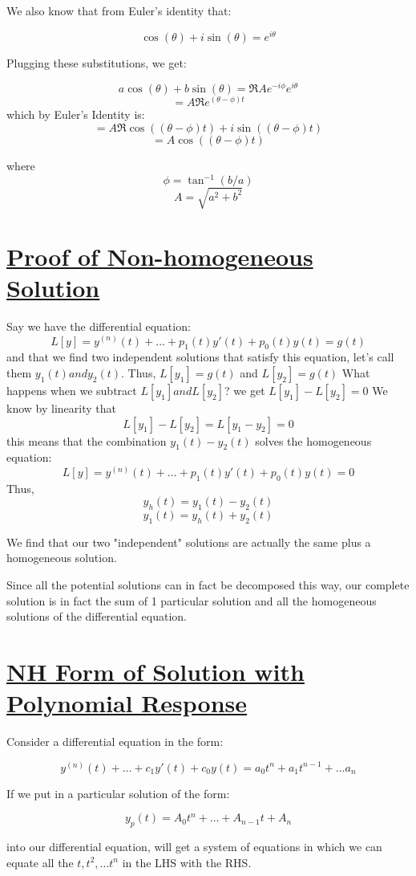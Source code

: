 \documentclass{report}
\begin{document}
{We also know that from Euler's identity that:

$$\cos(\theta) + i\sin(\theta) = e^{i\theta}$$

Plugging these substitutions, we get:

$$a\cos(\theta) + b\sin(\theta) = \Re{Ae^{-i\phi}e^{i\theta}}$$
$$=A\Re{e^{(\theta-\phi)t}}$$
which by Euler's Identity is:
$$=A\Re{\cos((\theta-\phi)t)+i\sin((\theta-\phi)t)}$$
$$=A\cos((\theta-\phi)t)$$

where 
$$\phi = \tan^{-1}(b/a)$$
$$A = \sqrt{a^2+b^2}$$




\section{\hyperref[th:nhSol]{Proof of Non-homogeneous Solution}}
\label{sec:prNhSol}
Say we have the differential equation:
 $$L[y] = y^{(n)}(t) + ... + p_1(t)y'(t) + p_0(t)y(t) = g(t)$$
and that we find two independent solutions that satisfy this equation, let's call them $y_1(t) and y_2(t)$.
Thus, $L[y_1]=g(t)$ and $L[y_2]=g(t)$
What happens when we subtract $L[y_1] and L[y_2]$?
we get $L[y_1]-L[y_2] = 0$
We know by linearity that 
$$L[y_1]-L[y_2] = L[y_1-y_2] = 0$$
this means that the combination $y_1(t)-y_2(t)$ solves the homogeneous equation:
$$L[y] = y^{(n)}(t) + ... + p_1(t)y'(t) + p_0(t)y(t) = 0$$
Thus,
$$y_h(t) = y_1(t)-y_2(t)$$
$$y_1(t) = y_h(t) + y_2(t)$$

We find that our two "independent" solutions are actually the same plus a homogeneous solution.

Since all the potential solutions can in fact be decomposed this way, our complete solution is in fact the sum of 1 particular solution and all the homogeneous solutions of the differential equation.


\section{\hyperref[th:polyResp]{NH Form of Solution with Polynomial Response}}
\label{sec:prPolyResp}
Consider a differential equation in the form:

$$y^{(n)}(t) + \dots + c_1y'(t) + c_0y(t) = a_0t^n + a_1t^{n-1} + \dots a_n$$

If we put in a particular solution of the form:

$$y_p(t) = A_0t^n + \dots + A_{n-1}t + A_n$$

into our differential equation, will get a system of equations in which we can equate all the $t, t^2, \dots t^n$ in the LHS with the RHS.

}
\end{document}
